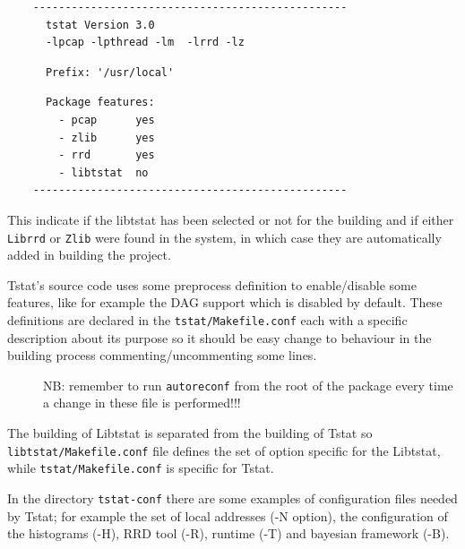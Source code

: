\documentclass[11pt]{article}
\begin{document}
\begin{small}\begin{verbatim}
    -------------------------------------------------
      tstat Version 3.0
      -lpcap -lpthread -lm  -lrrd -lz
\end{verbatim}\end{small} \noindent
\begin{small}\begin{verbatim}
      Prefix: '/usr/local'
\end{verbatim}\end{small} \noindent
\begin{small}\begin{verbatim}
      Package features:
        - pcap      yes
        - zlib      yes
        - rrd       yes
        - libtstat  no
    -------------------------------------------------
\end{verbatim}\end{small} \noindent
This indicate if the libtstat has been selected or not for the building 
and if either \texttt{Librrd} or \texttt{Zlib} were found in the system, 
in which case they are automatically added in building the project.



Tstat's source code uses some preprocess definition to enable/disable some features,
like for example the DAG support which is disabled by default.
These definitions are declared in the \texttt{tstat/Makefile.conf} each with a specific 
description about its purpose so it should be easy change to behaviour in the building
process commenting/uncommenting some lines.

\begin{description}

\item[{}] \mbox{}

NB: remember to run \texttt{autoreconf} from the root of the package every time 
a change in these file is performed!!!

\end{description}


The building of Libtstat is separated from the building of Tstat so \texttt{libtstat/Makefile.conf}
file defines the set of option specific for the Libtstat, while \texttt{tstat/Makefile.conf}
is specific for Tstat.



In the directory \texttt{tstat-conf} there are some examples of configuration files 
needed by Tstat; for example the set of local addresses (-N option), 
the configuration of the histograms (-H), RRD tool (-R), runtime (-T) and 
bayesian framework (-B).
\end{document}
